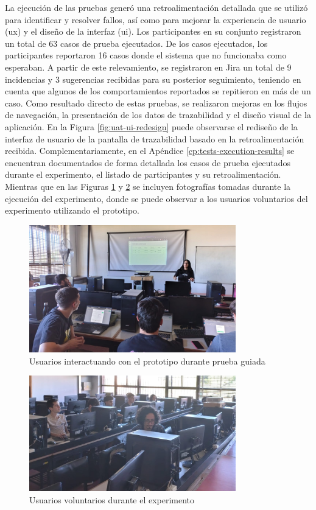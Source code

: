 La ejecución de las pruebas generó una retroalimentación detallada que se utilizó para identificar y resolver fallos, así como para mejorar la experiencia de usuario (\acrshort{ux}) y el diseño de la interfaz (\acrshort{ui}). Los participantes en su conjunto registraron un total de 63 casos de prueba ejecutados. De los casos ejecutados, los participantes reportaron 16 casos donde el sistema que no funcionaba como esperaban.
A partir de este relevamiento, se registraron en Jira un total de 9 incidencias y 3 sugerencias recibidas para su posterior seguimiento, teniendo en cuenta que algunos de los comportamientos reportados se repitieron en más de un caso. Como resultado directo de estas pruebas, se realizaron mejoras en los flujos de navegación, la presentación de los datos de trazabilidad y el diseño visual de la aplicación. En la Figura \ref{fig:uat-ui-redesign} puede observarse el rediseño de la interfaz de usuario de la pantalla de trazabilidad basado en la retroalimentación recibida. Complementariamente, en el Apéndice \ref{cp:tests-execution-results} se encuentran documentados de forma detallada los casos de prueba ejecutados durante el experimento, el listado de participantes y su retroalimentación. Mientras que en las Figuras \ref{fig:uat-picture-1} y \ref{fig:uat-picture-2} se incluyen fotografías tomadas durante la ejecución del experimento, donde se puede observar a los usuarios voluntarios del experimento utilizando el prototipo.

\begin{figure}[!htb]
\centering
\includegraphics[width=0.8\textwidth]{Figures/uat-1.jpg}
\caption{Usuarios interactuando con el prototipo durante prueba guiada}
\label{fig:uat-picture-1}
\end{figure}

\begin{figure}[!htb]
\centering
\includegraphics[width=0.8\textwidth]{Figures/uat-2.jpg}
\caption{Usuarios voluntarios durante el experimento}
\label{fig:uat-picture-2}
\end{figure}


